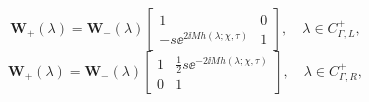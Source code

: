 \begin{equation}
\mathbf{W}_{+}(\lambda) = \mathbf{W}_{-}(\lambda)
\begin{bmatrix} 1 & 0 \\ -s \ee^{2\ii M h(\lambda;\chi,\tau)}& 1 \end{bmatrix},\quad \lambda\in C^+_{\Gamma,L},
\label{eq:W-jump-Gamma-plus-L}
\end{equation}
\begin{equation}
\mathbf{W}_{+}(\lambda) = \mathbf{W}_{-}(\lambda)
\begin{bmatrix} 1 & \frac{1}{2} s\ee^{-2\ii M h(\lambda;\chi,\tau)} \\ 0 & 1 \end{bmatrix},\quad \lambda\in C^+_{\Gamma,R},
\end{equation}
